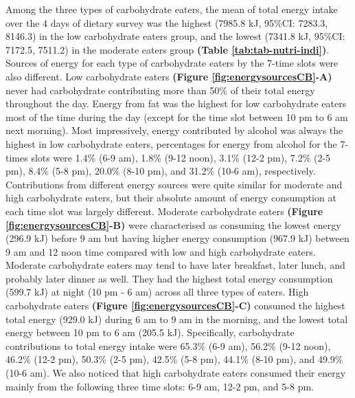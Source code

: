Among the three types of carbohydrate eaters, the mean of total energy intake over the 4 days of dietary survey was the highest (7985.8 kJ, 95\%CI: 7283.3, 8146.3) in the low carbohydrate eaters group, and the lowest (7341.8 kJ, 95\%CI: 7172.5, 7511.2) in the moderate eaters group \textbf{(Table \ref{tab:tab-nutri-indi})}. Sources of energy for each type of carbohydrate eaters by the 7-time slots were also different. Low carbohydrate eaters \textbf{(Figure \ref{fig:energysourcesCB}-A)} never had carbohydrate contributing more than 50\% of their total energy throughout the day. Energy from fat was the highest for low carbohydrate eaters most of the time during the day (except for the time slot between 10 pm to 6 am next morning). Most impressively, energy contributed by alcohol was always the highest in low carbohydrate eaters, percentages for energy from alcohol for the 7-times slots were 1.4\% (6-9 am), 1.8\% (9-12 noon), 3.1\% (12-2 pm), 7.2\% (2-5 pm), 8.4\% (5-8 pm), 20.0\% (8-10 pm), and 31.2\% (10-6 am), respectively. Contributions from different energy sources were quite similar for moderate and high carbohydrate eaters, but their absolute amount of energy consumption at each time slot was largely different. Moderate carbohydrate eaters \textbf{(Figure \ref{fig:energysourcesCB}-B)} were characterised as consuming the lowest energy (296.9 kJ) before 9 am but having higher energy consumption (967.9 kJ) between 9 am and 12 noon time compared with low and high carbohydrate eaters. Moderate carbohydrate eaters may tend to have later breakfast, later lunch, and probably later dinner as well. They had the highest total energy consumption (599.7 kJ) at night (10 pm - 6 am) across all three types of eaters. High carbohydrate eaters \textbf{(Figure \ref{fig:energysourcesCB}-C)} consumed the highest total energy (929.0 kJ) during 6 am to 9 am in the morning, and the lowest total energy between 10 pm to 6 am (205.5 kJ). Specifically, carbohydrate contributions to total energy intake were 65.3\% (6-9 am), 56.2\% (9-12 noon), 46.2\% (12-2 pm), 50.3\% (2-5 pm), 42.5\% (5-8 pm), 44.1\% (8-10 pm), and 49.9\% (10-6 am). We also noticed that high carbohydrate eaters consumed their energy mainly from the following three time slots: 6-9 am, 12-2 pm, and 5-8 pm. 

